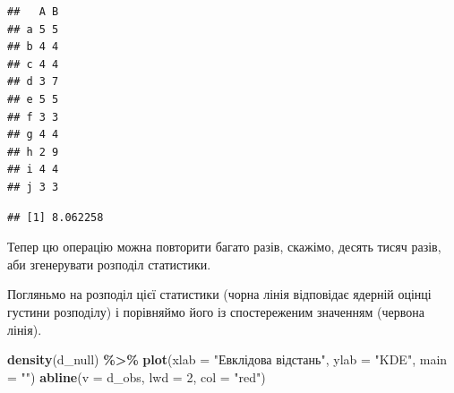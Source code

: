 \documentclass[
  11pt,
]{book}
\newenvironment{Shaded}{\begin{snugshade}}{\end{snugshade}}
\newcommand{\AttributeTok}[1]{\textcolor[rgb]{0.13,0.29,0.53}{#1}}
\newcommand{\ControlFlowTok}[1]{\textcolor[rgb]{0.13,0.29,0.53}{\textbf{#1}}}
\newcommand{\DecValTok}[1]{\textcolor[rgb]{0.00,0.00,0.81}{#1}}
\newcommand{\FunctionTok}[1]{\textcolor[rgb]{0.13,0.29,0.53}{\textbf{#1}}}
\newcommand{\NormalTok}[1]{#1}
\newcommand{\OtherTok}[1]{\textcolor[rgb]{0.56,0.35,0.01}{#1}}
\newcommand{\SpecialCharTok}[1]{\textcolor[rgb]{0.81,0.36,0.00}{\textbf{#1}}}
\newcommand{\StringTok}[1]{\textcolor[rgb]{0.31,0.60,0.02}{#1}}
\begin{document}
\begin{verbatim}
##   A B
## a 5 5
## b 4 4
## c 4 4
## d 3 7
## e 5 5
## f 3 3
## g 4 4
## h 2 9
## i 4 4
## j 3 3
\end{verbatim}

\begin{Shaded}
\end{Shaded}

\begin{verbatim}
## [1] 8.062258
\end{verbatim}

Тепер цю операцію можна повторити багато разів, скажімо, десять тисяч разів, аби згенерувати розподіл статистики.

\begin{Shaded}
\end{Shaded}

Погляньмо на розподіл цієї статистики (чорна лінія відповідає ядерній оцінці густини розподілу) і порівняймо його із спостереженим значенням (червона лінія).

\begin{Shaded}
\begin{Highlighting}[]
\FunctionTok{density}\NormalTok{(d\_null) }\SpecialCharTok{\%\textgreater{}\%} \FunctionTok{plot}\NormalTok{(}\AttributeTok{xlab =} \StringTok{"Евклідова відстань"}\NormalTok{, }\AttributeTok{ylab =} \StringTok{"KDE"}\NormalTok{, }\AttributeTok{main =} \StringTok{""}\NormalTok{)}
\FunctionTok{abline}\NormalTok{(}\AttributeTok{v =}\NormalTok{ d\_obs, }\AttributeTok{lwd =} \DecValTok{2}\NormalTok{, }\AttributeTok{col =} \StringTok{"red"}\NormalTok{)}
\end{Highlighting}
\end{Shaded}
\end{document}
